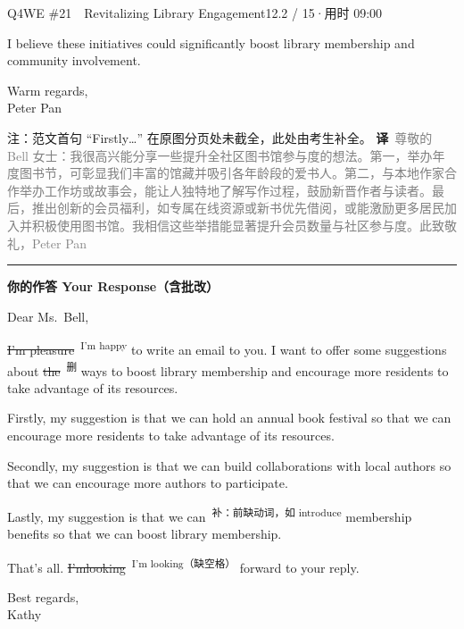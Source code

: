 \documentclass[11pt]{article}
\newcommand{\fix}[2]{%
  \colorbox{cWrongBg}{\textcolor{cWrong}{\sout{#1}}}%
  \,\textsuperscript{\textcolor{cFix}{\footnotesize #2}}}
\newcommand{\del}[1]{%
  \colorbox{cDelBg}{\textcolor{cDelete}{\sout{#1}}}%
  \,\textsuperscript{\textcolor{cDelete}{\footnotesize 删}}}
\newcommand{\add}[2]{%
  \textcolor{cAdd}{\uwave{#1}}%
  \,\textsuperscript{\textcolor{cAdd}{\footnotesize 补：#2}}}
\newcommand{\ptesub}[1]{%
  \par\needspace{2\baselineskip}\smallskip
  {\color{cAccent}\rule[-0.2ex]{3pt}{1.05em}}\hspace{6pt}%
  {\bfseries\color{cHead}#1}\par\nopagebreak\smallskip}
\newcommand{\zh}[1]{{\footnotesize\textcolor{cNote}{\textbf{译}}\ \textcolor{gray}{#1}}}
\begin{document}
\begin{qblock}{Q4\quad WE \#21\ \ Revitalizing Library Engagement}{12.2 / 15\quad·\quad 用时 09:00}
\begin{modelbox}
I believe these initiatives could significantly boost library membership and community involvement.

Warm regards,\\ Peter Pan
\end{modelbox}
{\footnotesize\color{gray} 注：范文首句 “Firstly…” 在原图分页处未截全，此处由考生补全。}
\zh{尊敬的 Bell 女士：我很高兴能分享一些提升全社区图书馆参与度的想法。第一，举办年度图书节，可彰显我们丰富的馆藏并吸引各年龄段的爱书人。第二，与本地作家合作举办工作坊或故事会，能让人独特地了解写作过程，鼓励新晋作者与读者。最后，推出创新的会员福利，如专属在线资源或新书优先借阅，或能激励更多居民加入并积极使用图书馆。我相信这些举措能显著提升会员数量与社区参与度。此致敬礼，Peter Pan}

\ptesub{你的作答 Your Response（含批改）}
\begin{youbox}
Dear Ms.\ Bell,

\fix{I'm pleasure}{I'm happy} to write an email to you. I want to offer some suggestions about \del{the} ways to boost library membership and encourage more residents to take advantage of its resources.

Firstly, my suggestion is that we can hold an annual book festival so that we can encourage more residents to take advantage of its resources.

Secondly, my suggestion is that we can build collaborations with local authors so that we can encourage more authors to participate.

Lastly, my suggestion is that we can \add{innovative}{前缺动词，如 introduce} membership benefits so that we can boost library membership.

That's all. \fix{I'mlooking}{I'm looking（缺空格）} forward to your reply.

Best regards,\\ Kathy
\end{youbox}


\end{qblock}
\end{document}
